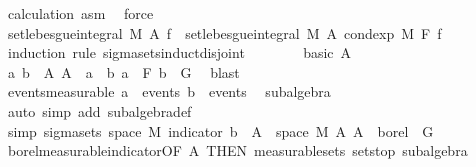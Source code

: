 \begin{isabellebody}
\ calculation\ asm\ \isamarkupfalse%
\ force\isanewline
\ \ \ \ \isamarkupfalse%
\ \isamarkupfalse%
\ {\isachardoublequoteopen}set{\isacharunderscore}{\kern0pt}lebesgue{\isacharunderscore}{\kern0pt}integral\ M\ A\ f\ {\isacharequal}{\kern0pt}\ set{\isacharunderscore}{\kern0pt}lebesgue{\isacharunderscore}{\kern0pt}integral\ M\ A\ {\isacharparenleft}{\kern0pt}cond{\isacharunderscore}{\kern0pt}exp\ M\ F\ f{\isacharparenright}{\kern0pt}{\isachardoublequoteclose}\isanewline
\ \ \ \ \isamarkupfalse%
\ {\isacharparenleft}{\kern0pt}induction\ rule{\isacharcolon}{\kern0pt}\ sigma{\isacharunderscore}{\kern0pt}sets{\isacharunderscore}{\kern0pt}induct{\isacharunderscore}{\kern0pt}disjoint{\isacharparenright}{\kern0pt}\isanewline
\ \ \ \ \ \ \isamarkupfalse%
\ {\isacharparenleft}{\kern0pt}basic\ A{\isacharparenright}{\kern0pt}\isanewline
\ \ \ \ \ \ \isamarkupfalse%
\ \isamarkupfalse%
\ a\ b\ \ A{\isacharcolon}{\kern0pt}\ {\isachardoublequoteopen}A\ {\isacharequal}{\kern0pt}\ a\ {\isasyminter}\ b{\isachardoublequoteclose}\ {\isachardoublequoteopen}a\ {\isasymin}\ F{\isachardoublequoteclose}\ {\isachardoublequoteopen}b\ {\isasymin}\ G{\isachardoublequoteclose}\ \isamarkupfalse%
\ blast\isanewline
\isanewline
\ \ \ \ \ \ \isamarkupfalse%
\ events{\isacharbrackleft}{\kern0pt}measurable{\isacharbrackright}{\kern0pt}{\isacharcolon}{\kern0pt}\ {\isachardoublequoteopen}a\ {\isasymin}\ events{\isachardoublequoteclose}\ {\isachardoublequoteopen}b\ {\isasymin}\ events{\isachardoublequoteclose}\ \isamarkupfalse%
\ subalgebra\ \isamarkupfalse%
\ {\isacharparenleft}{\kern0pt}auto\ simp\ add{\isacharcolon}{\kern0pt}\ subalgebra{\isacharunderscore}{\kern0pt}def{\isacharparenright}{\kern0pt}\isanewline
\isanewline
\ \ \ \ \ \ \isamarkupfalse%
\ {\isacharbrackleft}{\kern0pt}simp{\isacharbrackright}{\kern0pt}{\isacharcolon}{\kern0pt}\ {\isachardoublequoteopen}sigma{\isacharunderscore}{\kern0pt}sets\ {\isacharparenleft}{\kern0pt}space\ M{\isacharparenright}{\kern0pt}\ {\isacharbraceleft}{\kern0pt}indicator\ b\ {\isacharminus}{\kern0pt}{\isacharbackquote}{\kern0pt}\ A\ {\isasyminter}\ space\ M\ {\isacharbar}{\kern0pt}A{\isachardot}{\kern0pt}\ A\ {\isasymin}\ borel{\isacharbraceright}{\kern0pt}\ {\isasymsubseteq}\ G{\isachardoublequoteclose}\isanewline
\ \ \ \ \ \ \ \ \isamarkupfalse%
\ borel{\isacharunderscore}{\kern0pt}measurable{\isacharunderscore}{\kern0pt}indicator{\isacharbrackleft}{\kern0pt}OF\ A{\isacharparenleft}{\kern0pt}{}{\isacharparenright}{\kern0pt}{\isacharcomma}{\kern0pt}\ THEN\ measurable{\isacharunderscore}{\kern0pt}sets{\isacharbrackright}{\kern0pt}\ sets{\isachardot}{\kern0pt}top\ subalgebra\isanewline

\end{isabellebody}

